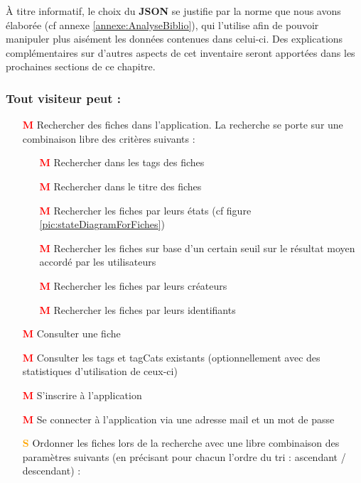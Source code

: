 À titre informatif, le choix du \textbf{JSON} se justifie par la norme que nous avons élaborée (cf annexe \ref{annexe:AnalyseBiblio}), qui l'utilise afin de pouvoir manipuler plus aisément les données contenues dans celui-ci.
Des explications complémentaires sur d'autres aspects de cet inventaire seront apportées dans les prochaines sections de ce chapitre.

\subsubsection*{Tout visiteur peut : }

\begin{itemize}
    \item[\textcolor{red}{\textbf{M}}] Rechercher des \glspl{fiche} dans l'application. La recherche se porte sur une combinaison libre des critères suivants : 
    \begin{itemize}
        \item[\textcolor{red}{\textbf{M}}] Rechercher dans les \glspl{tag} des \glspl{fiche}
        \item[\textcolor{red}{\textbf{M}}] Rechercher dans le titre des \glspl{fiche}
        \item[\textcolor{red}{\textbf{M}}] Rechercher les \glspl{fiche} par leurs états (cf figure \ref{pic:stateDiagramForFiches})
        \item[\textcolor{red}{\textbf{M}}] Rechercher les \glspl{fiche} sur base d'un certain seuil sur le résultat moyen accordé par les utilisateurs
        \item[\textcolor{red}{\textbf{M}}] Rechercher les \glspl{fiche} par leurs créateurs
        \item[\textcolor{red}{\textbf{M}}] Rechercher les \glspl{fiche} par leurs identifiants
    \end{itemize}
        \item[\textcolor{red}{\textbf{M}}] Consulter une \gls{fiche}
    \item[\textcolor{red}{\textbf{M}}] Consulter les \glspl{tag} et \glspl{tagCat} existants (optionnellement avec des statistiques d'utilisation de ceux-ci)
    \item[\textcolor{red}{\textbf{M}}] S'inscrire à l'application
    \item[\textcolor{red}{\textbf{M}}] Se connecter à l'application via une adresse mail et un mot de passe
    \item[\textcolor{orange}{\textbf{S}}] Ordonner les \glspl{fiche} lors de la recherche avec une libre combinaison des paramètres suivants (en précisant pour chacun l'ordre du tri : ascendant / descendant) :

\end{itemize}
